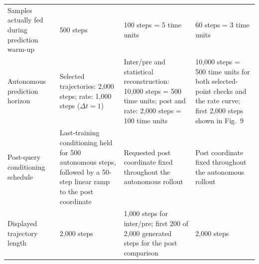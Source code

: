 \documentclass[10pt,a4paper]{article}
\begin{document}
\begin{landscape}
\begin{tabularx}{\linewidth}{L{38mm} Y Y Y}
Samples actually fed during prediction warm-up
& 500 steps
& 100 steps = 5 time units
& 60 steps = 3 time units \\

Autonomous prediction horizon
& Selected trajectories: 2,000 steps; rate: 1,000 steps ($\Delta t=1$)
& Inter/pre and statistical reconstruction: 10,000 steps = 500 time units; post and rate: 2,000 steps = 100 time units
& 10,000 steps = 500 time units for both selected-point checks and the rate curve; first 2,000 steps shown in Fig.~9 \\

Post-query conditioning schedule
& Last-training conditioning held for 500 autonomous steps, followed by a 50-step linear ramp to the post coordinate
& Requested post coordinate fixed throughout the autonomous rollout
& Post coordinate fixed throughout the autonomous rollout \\

Displayed trajectory length
& 2,000 steps
& 1,000 steps for inter/pre; first 200 of 2,000 generated steps for the post comparison
& 2,000 steps \\
\bottomrule
\end{tabularx}
\end{landscape}
\end{document}
